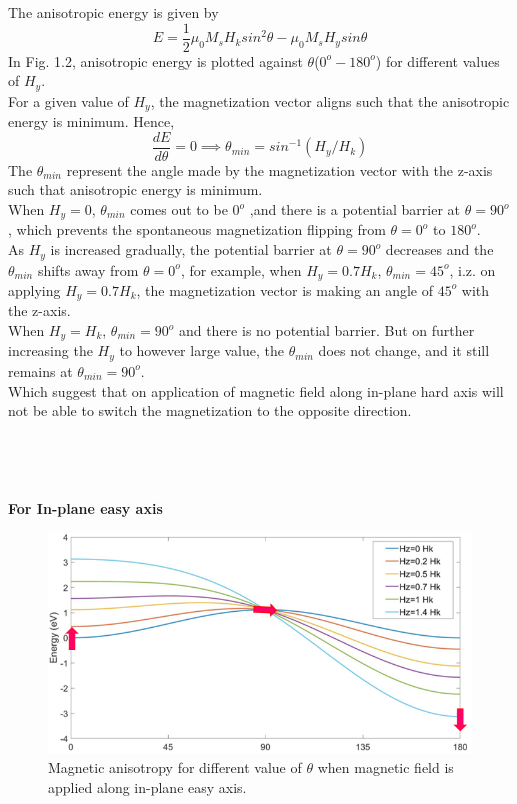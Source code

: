 \documentclass[12pt,a4paper,bold]{thesis}
\theoremstyle{thm}
\theoremstyle{definition}
\begin{document}
The anisotropic energy is given by 
\[E=\frac{1}{2}\mu_0M_sH_ksin^2\theta - \mu_0M_sH_ysin\theta\]
In Fig. 1.2, anisotropic energy is plotted against $\theta$($0^o - 180^o$) for different values of $H_y$.\\
For a given value of $H_y$, the magnetization vector aligns such that the anisotropic energy is minimum. Hence, \[\frac{dE}{d\theta}=0 \implies \theta_{min}=sin^{-1}(H_y/H_k)\]
The $\theta_{min}$ represent the angle made by the magnetization vector with the z-axis such that anisotropic energy is minimum. \\
When $H_y=0$, $\theta_{min}$ comes out to be $0^o$ ,and there is a potential barrier at $\theta=90^o$, which prevents the spontaneous magnetization flipping from $\theta=0^o$ to $180^o$. \\
As $H_y$ is increased gradually, the potential barrier at $\theta=90^o$ decreases and the $\theta_{min}$ shifts away from $\theta=0^o$, for example, when $H_y=0.7H_k$, $\theta_{min}=45^o$, i.z. on applying $H_y=0.7H_k$, the magnetization vector is making an angle of $45^o$ with the z-axis.\\
When $H_y=H_k$, $\theta_{min}=90^o$ and there is no potential barrier. But on further increasing the $H_y$ to however large value, the $\theta_{min}$ does not change, and it still remains at $\theta_{min}=90^o$.\\
\indent \indent Which suggest that on application of magnetic field along in-plane hard axis will not be able to switch the magnetization to the opposite direction.\\
\\\\\\\\
\textbf{For In-plane easy axis}
\begin{figure}[H]
	\centering
   \includegraphics[scale=0.56]{Images/21.png} 
   \caption{Magnetic anisotropy for different value of $\theta$ when magnetic field is applied along in-plane easy axis.}
\end{figure}
\end{document}
